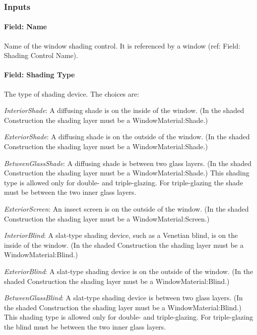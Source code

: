 \subsubsection{Inputs}\label{inputs-32-001}

\paragraph{Field: Name}\label{field-name-29-001}

Name of the window shading control. It is referenced by a window (ref: Field: Shading Control Name).

\paragraph{Field: Shading Type}\label{field-shading-type}

The type of shading device. The choices are:

\emph{InteriorShade}: A diffusing shade is on the inside of the window. (In the shaded Construction the shading layer must be a WindowMaterial:Shade.)

\emph{ExteriorShade}: A diffusing shade is on the outside of the window. (In the shaded Construction the shading layer must be a WindowMaterial:Shade.)

\emph{BetweenGlassShade}: A diffusing shade is between two glass layers. (In the shaded Construction the shading layer must be a WindowMaterial:Shade.) This shading type is allowed only for double- and triple-glazing. For triple-glazing the shade must be between the two inner glass layers.

\emph{ExteriorScreen}: An insect screen is on the outside of the window. (In the shaded Construction the shading layer must be a WindowMaterial:Screen.)

\emph{InteriorBlind}: A slat-type shading device, such as a Venetian blind, is on the inside of the window. (In the shaded Construction the shading layer must be a WindowMaterial:Blind.)

\emph{ExteriorBlind}: A slat-type shading device is on the outside of the window. (In the shaded Construction the shading layer must be a WindowMaterial:Blind.)

\emph{BetweenGlassBlind}: A slat-type shading device is between two glass layers. (In the shaded Construction the shading layer must be a WindowMaterial:Blind.) This shading type is allowed only for double- and triple-glazing. For triple-glazing the blind must be between the two inner glass layers.

